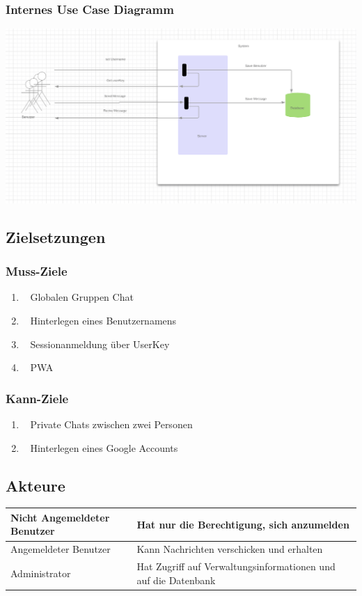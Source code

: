 \documentclass[12pt]{article}
\begin{document}
      \subsubsection{Internes Use Case Diagramm}
        \includegraphics[width=\textwidth]{intern-usecase.png}

    \subsection{Zielsetzungen}
      \subsubsection{Muss-Ziele}
        \begin{enumerate}
          \item \faGlobe~ Globalen Gruppen Chat
          \item \faUser~ Hinterlegen eines Benutzernamens
          \item \faKey~ Sessionanmeldung über UserKey
          \item \faMobile~ PWA
        \end{enumerate}

      \subsubsection{Kann-Ziele}
        \begin{enumerate}
          \item \faUsers~ Private Chats zwischen zwei Personen
          \item \faGoogle~ Hinterlegen eines Google Accounts
        \end{enumerate}

    \subsection{Akteure}
        \begin{table}[H]
          \begin{tabularx}{\textwidth}{|l|X|}
            \hline
            Nicht Angemeldeter Benutzer & Hat nur die Berechtigung, sich anzumelden  \\ \hline
            Angemeldeter Benutzer & Kann Nachrichten verschicken und erhalten  \\ \hline
            Administrator & Hat Zugriff auf Verwaltungsinformationen und auf die Datenbank \\ \hline
          \end{tabularx}
        \end{table}
\end{document}
